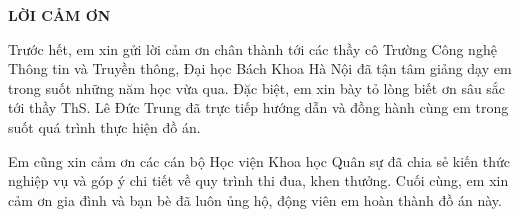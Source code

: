 \documentclass[../DoAn.tex]{subfiles}
\begin{document}
\begin{center}
    \Large{\textbf{LỜI CẢM ƠN}}\\
\end{center}
\vspace{1cm}

Trước hết, em xin gửi lời cảm ơn chân thành tới các thầy cô Trường Công nghệ Thông tin và Truyền thông, Đại học Bách Khoa Hà Nội đã tận tâm giảng dạy em trong suốt những năm học vừa qua. Đặc biệt, em xin bày tỏ lòng biết ơn sâu sắc tới thầy ThS. Lê Đức Trung đã trực tiếp hướng dẫn và đồng hành cùng em trong suốt quá trình thực hiện đồ án.

Em cũng xin cảm ơn các cán bộ Học viện Khoa học Quân sự đã chia sẻ kiến thức nghiệp vụ và góp ý chi tiết về quy trình thi đua, khen thưởng. Cuối cùng, em xin cảm ơn gia đình và bạn bè đã luôn ủng hộ, động viên em hoàn thành đồ án này.
\end{document}
